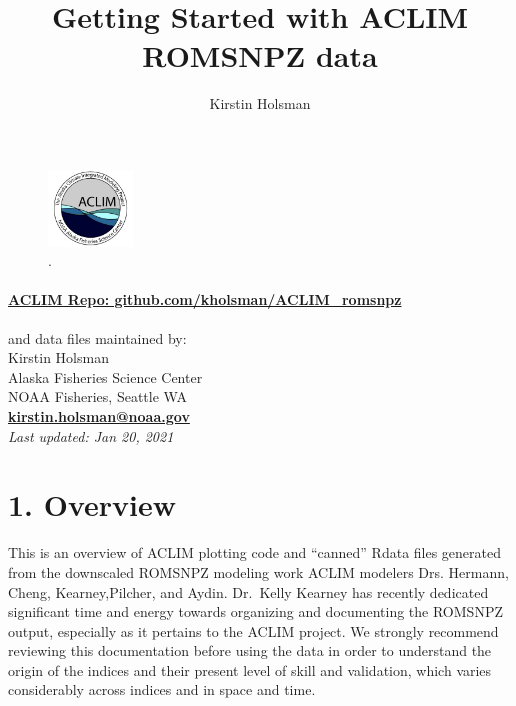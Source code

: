 \documentclass[
]{article}
\title{Getting Started with ACLIM ROMSNPZ data}
\author{Kirstin Holsman}
\date{}
\begin{document}
\maketitle

{
\setcounter{tocdepth}{2}
\tableofcontents
}
\begin{figure}
\centering
\includegraphics[width=0.2\textwidth,height=\textheight]{Figs/ACLIM_logo.jpg}
\caption{.}
\end{figure}

\hypertarget{aclim-repo-github.comkholsmanaclim_romsnpz}{%
\paragraph{\texorpdfstring{\href{https://github.com/kholsman/ACLIM_romsnpz}{\textbf{ACLIM
Repo:
github.com/kholsman/ACLIM\_romsnpz}}}{ACLIM Repo: github.com/kholsman/ACLIM\_romsnpz}}\label{aclim-repo-github.comkholsmanaclim_romsnpz}}

and data files maintained by:\\
Kirstin Holsman\\
Alaska Fisheries Science Center\\
NOAA Fisheries, Seattle WA\\
\textbf{\url{kirstin.holsman@noaa.gov}}~\\
\emph{Last updated: Jan 20, 2021}

\hypertarget{overview}{%
\section{1. Overview}\label{overview}}

This is an overview of ACLIM plotting code and ``canned'' Rdata files
generated from the downscaled ROMSNPZ modeling work ACLIM modelers Drs.
Hermann, Cheng, Kearney,Pilcher, and Aydin. Dr.~Kelly Kearney has
recently dedicated significant time and energy towards organizing and
documenting the ROMSNPZ output, especially as it pertains to the ACLIM
project. We strongly recommend reviewing this documentation before using
the data in order to understand the origin of the indices and their
present level of skill and validation, which varies considerably across
indices and in space and time.
\end{document}

